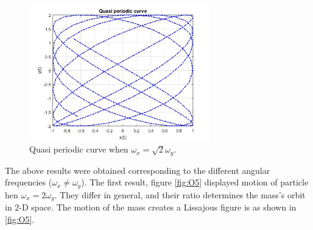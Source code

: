 \newpage

 \begin{figure}[hbt!]
	\centering
	\begin{framed}
	\includegraphics[width=0.7\textwidth]{Figures/quasi periodic.jpg}
	\end{framed}
	\caption{ Quasi periodic curve when $\omega_x = \sqrt{2}\omega_y$. }
	\label{fig:O6}
\end{figure}

The above results were obtained corresponding to the different angular frequencies ($\omega_x \neq \omega_y$). The first result, figure \ref{fig:O5} displayed motion of particle hen $\omega_x = 2\omega_y$. They differ in general, and their ratio determines the mass's orbit in 2-D space. The motion of the mass creates a Lissajous figure is as shown in \ref{fig:O5}.